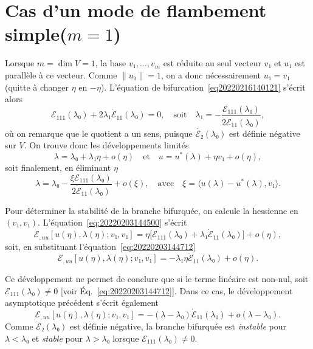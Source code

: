 \documentclass[12pt, final]{amsart}
\theoremstyle{definition}
\begin{document}
\section{Cas d'un mode de flambement simple(\(m = 1\))}

Lorsque \(m = \dim V = 1\), la base \(v₁, \ldots, v_m\) est réduite au seul vecteur \(v₁\) et \(u₁\) est parallèle à ce vecteur. Comme \(\lVert u₁ \rVert = 1\), on a donc nécessairement \(u₁ = v₁\)(quitte à changer \(η\) en \(- η\)). L'équation de bifurcation~\eqref{eq20220216140121} s'écrit alors
\begin{equation}
  \label{eq:20220203144712}
  ℰ_{111}(λ₀) + 2 λ₁ \dot{ℰ}_{11}(λ₀) = 0,
  \quad \text{soit} \quad
  λ₁ = - \frac{ℰ_{111}(λ₀)}{2 \dot{ℰ}_{11}(λ₀)},
\end{equation}
où on remarque que le quotient a un sens, puisque \(\dot{ℰ₂}(λ₀)\) est définie
négative sur \(V\). On trouve donc les développements limités
\begin{equation}
  λ = λ₀ + λ₁ η + o(η)
  \quad \text{et} \quad
  u = u^{\ast}(λ) + η v₁ + o(η),
\end{equation}
soit finalement, en éliminant \(η\)
\begin{equation}
 λ = λ₀ - \frac{ξ ℰ_{111}(λ₀)}{2 \dot{ℰ}_{11}(λ₀)} + o(ξ),
 \quad \text{avec} \quad
 ξ = 〈u(λ) - u^{\ast}(λ), v₁〉 .
\end{equation}

Pour déterminer la stabilité de la branche bifurquée, on calcule la hessienne en
\((v₁, v₁)\). L'équation~\eqref{eq:20220203144500} s'écrit
\begin{equation}
 ℰ_{, uu} [u(η), λ(η); v₁, v₁] = η \bigl[ℰ_{111}(λ₀) + λ₁ \dot{ℰ}_{1 1}(λ₀)\bigr] + o(η),
\end{equation}
soit, en substituant l'équation~\eqref{eq:20220203144712}
\begin{equation}
 ℰ_{, uu} [u(η), λ(η); v₁, v₁] = - λ₁ η \dot{ℰ}_{11}(λ₀) + o(η).
\end{equation}

Ce développement ne permet de conclure que si le terme linéaire est non-nul,
soit \(ℰ_{111}(λ₀) ≠ 0\) [voir Éq.~\eqref{eq:20220203144712}]. Dans ce cas, le
développement asymptotique précédent s'écrit également
\begin{equation}
 ℰ_{, uu} [u(η), λ(η); v₁, v₁] = - (λ - λ₀) \dot{ℰ}_{11}(λ₀) + o(λ - λ₀).
\end{equation}
Comme \(\dot{ℰ}₂(λ₀)\) est définie négative, la branche bifurquée est
\emph{instable} pour \(λ < λ₀\) et \emph{stable} pour \(λ > λ₀\) lorsque
\(ℰ_{111}(λ₀) ≠ 0\).
\end{document}
